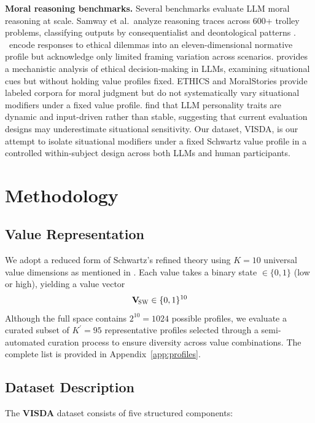 \documentclass[11pt]{article}
\newcommand{\Vsw}{\mathbf{V}_{\!\textsc{SW}}}
\begin{document}
\textbf{Moral reasoning benchmarks.}
Several benchmarks evaluate LLM moral reasoning at scale. Samway
et al.\ analyze reasoning traces across 600+ trolley problems,
classifying outputs by consequentialist and deontological patterns
\citep{samway2025language}. \citep{mahajan2025mapping}\ encode responses to
ethical dilemmas into an eleven-dimensional normative profile but
acknowledge only limited framing variation across scenarios. \citep{schacht2025mapping} provides a mechanistic
analysis of ethical decision-making in LLMs, examining situational cues
but without holding value profiles fixed.
ETHICS \citep{hendrycks2021ethics} and MoralStories \citep{emelin2021moral}
provide labeled corpora for moral judgment but do not systematically
vary situational modifiers under a fixed value profile. \citep{jiaqi2025comparative}
find that LLM personality traits are dynamic and input-driven
rather than stable, suggesting that
current evaluation designs may underestimate situational sensitivity.
Our dataset, VISDA, is our attempt to isolate
situational modifiers under a fixed Schwartz value profile in a
controlled within-subject design across both LLMs and human
participants.

\section{Methodology}
\label{sec:method}

\subsection{Value Representation}
\label{sec:value-rep}

We adopt a reduced form of Schwartz's refined theory using $K = 10$ universal value dimensions as mentioned in \citep{schwartz1992universals}. Each value takes a binary state $\in \{0,1\}$ (low or high), yielding a value vector
\[
\Vsw \in \{0,1\}^{10}
\]
Although the full space contains \(2^{10} = 1024\) possible profiles, we evaluate a curated subset of \(K^{\prime}= 95\) representative profiles selected through a semi-automated curation process to ensure diversity across value combinations. The complete list is provided in Appendix~\ref{app:profiles}.

\subsection{Dataset Description}
\label{sec:dataset}

The \textbf{VISDA} dataset consists of five structured components:
\end{document}
